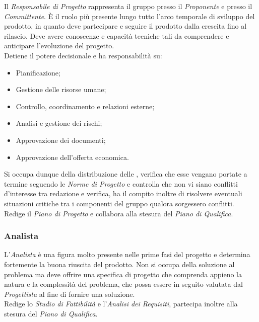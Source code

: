 \documentclass{scalatekids-article}
\begin{document}
Il \textit{Responsabile di Progetto} rappresenta il gruppo presso il \textit{Proponente}
e presso il \textit{Committente}. È il ruolo più presente lungo tutto l'arco temporale di
sviluppo del prodotto, in quanto deve partecipare e seguire il prodotto dalla
crescita fino al rilascio. Deve avere conoscenze e capacità
tecniche tali da comprendere e anticipare l'evoluzione del progetto.\\
Detiene il potere decisionale e ha responsabilità su:
\begin{itemize}
\item Pianificazione;
\item Gestione delle risorse umane;
\item Controllo, coordinamento e relazioni esterne;
\item Analisi e gestione dei rischi;
\item Approvazione dei documenti;
\item Approvazione dell'offerta economica.
\end{itemize}
Si occupa dunque della distribuzione delle , verifica che esse vengano
portate a termine seguendo le \textit{Norme di Progetto} e controlla che non vi
siano conflitti d'interesse tra redazione e verifica, ha il compito inoltre di
risolvere eventuali situazioni critiche tra i componenti del gruppo qualora
sorgessero conflitti.\\ Redige il \textit{Piano di Progetto} e collabora alla
stesura del \textit{Piano di Qualifica}.

\subsubsection{Analista}

L'\textit{Analista} è una figura molto presente nelle prime fasi del progetto e
determina fortemente la buona riuscita del prodotto. Non si occupa della
soluzione al problema ma deve offrire una specifica di progetto che comprenda
appieno la natura e la complessità del problema, che possa essere in seguito
valutata dal \textit{Progettista} al fine di fornire una soluzione.\\ Redige lo
\textit{Studio di Fattibilità} e l'\textit{Analisi dei Requisiti}, partecipa
inoltre alla stesura del \textit{Piano di Qualifica}.
\end{document}
